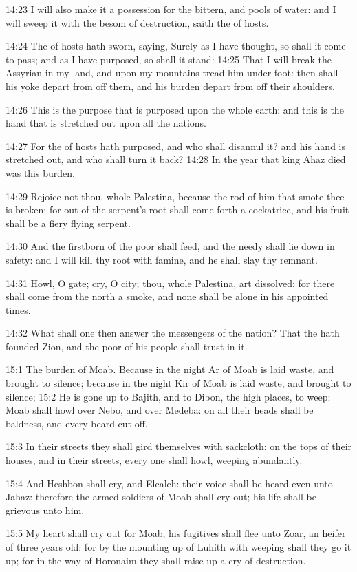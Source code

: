 14:23 I will also make it a possession for the bittern, and pools of
water: and I will sweep it with the besom of destruction, saith the
\LORD of hosts.

14:24 The \LORD of hosts hath sworn, saying, Surely as I have thought,
so shall it come to pass; and as I have purposed, so shall it stand:
14:25 That I will break the Assyrian in my land, and upon my mountains
tread him under foot: then shall his yoke depart from off them, and
his burden depart from off their shoulders.

14:26 This is the purpose that is purposed upon the whole earth: and
this is the hand that is stretched out upon all the nations.

14:27 For the \LORD of hosts hath purposed, and who shall disannul it?
and his hand is stretched out, and who shall turn it back?  14:28 In
the year that king Ahaz died was this burden.

14:29 Rejoice not thou, whole Palestina, because the rod of him that
smote thee is broken: for out of the serpent's root shall come forth a
cockatrice, and his fruit shall be a fiery flying serpent.

14:30 And the firstborn of the poor shall feed, and the needy shall
lie down in safety: and I will kill thy root with famine, and he shall
slay thy remnant.

14:31 Howl, O gate; cry, O city; thou, whole Palestina, art dissolved:
for there shall come from the north a smoke, and none shall be alone
in his appointed times.

14:32 What shall one then answer the messengers of the nation? That
the \LORD hath founded Zion, and the poor of his people shall trust in
it.

15:1 The burden of Moab. Because in the night Ar of Moab is laid
waste, and brought to silence; because in the night Kir of Moab is
laid waste, and brought to silence; 15:2 He is gone up to Bajith, and
to Dibon, the high places, to weep: Moab shall howl over Nebo, and
over Medeba: on all their heads shall be baldness, and every beard cut
off.

15:3 In their streets they shall gird themselves with sackcloth: on
the tops of their houses, and in their streets, every one shall howl,
weeping abundantly.

15:4 And Heshbon shall cry, and Elealeh: their voice shall be heard
even unto Jahaz: therefore the armed soldiers of Moab shall cry out;
his life shall be grievous unto him.

15:5 My heart shall cry out for Moab; his fugitives shall flee unto
Zoar, an heifer of three years old: for by the mounting up of Luhith
with weeping shall they go it up; for in the way of Horonaim they
shall raise up a cry of destruction.

